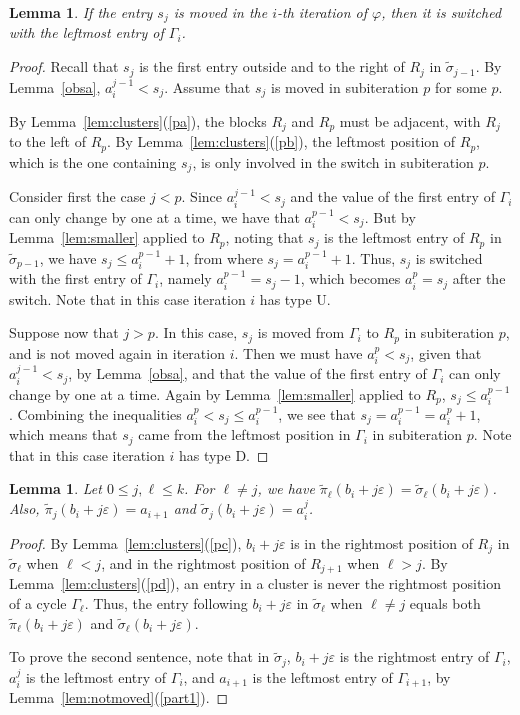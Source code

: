 \documentclass[11pt]{amsart}
\newtheorem{lemma}[theorem]{Lemma}
\newcommand\wt{\widetilde}
\newcommand\bij{\varphi}
\newcommand\eps{\varepsilon}
\newcommand\sigm{\wt\sigma}
\newcommand\pim{\wt\pi}
\begin{document}
\begin{lemma}\label{obsd}
If the entry $s_j$ is moved in the $i$-th iteration of $\bij$, then it is switched with the leftmost entry of $\Gamma_i$.
\end{lemma}

\begin{proof}
Recall that $s_j$ is the first entry outside and to the right of $R_j$ in $\sigm_{j-1}$. By Lemma~\ref{obsa}, $a_i^{j-1}<s_j$. Assume that $s_j$ is moved in subiteration $p$ for some $p$.

By Lemma~\ref{lem:clusters}(\ref{pa}), the blocks $R_j$ and $R_p$ must be adjacent, with $R_j$ to the left of $R_p$. By Lemma~\ref{lem:clusters}(\ref{pb}),
the leftmost position of $R_p$, which is the one containing $s_j$, is only involved in the switch in subiteration $p$.

Consider first the case $j<p$. Since $a_i^{j-1}<s_j$ and the value of the first entry of $\Gamma_i$ can only change by one at a time,
we have that $a_i^{p-1}<s_j$. But by Lemma~\ref{lem:smaller} applied to $R_p$, noting that $s_j$ is the leftmost entry of $R_p$ in $\sigm_{p-1}$, we have
$s_j\le a_i^{p-1}+1$, from where $s_j=a_i^{p-1}+1$. Thus, $s_j$ is switched with the first entry of $\Gamma_i$, namely $a_i^{p-1}=s_j-1$, which becomes $a_i^p=s_j$ after the switch. Note that in this case iteration $i$ has type U.

Suppose now that $j>p$. In this case, $s_j$ is moved from $\Gamma_i$ to $R_p$ in subiteration $p$, and is not moved again in iteration $i$. Then we must have $a_i^{p}<s_j$, given that $a_i^{j-1}<s_j$, by Lemma~\ref{obsa},
and that the value of the first entry of $\Gamma_i$ can only change by one at a time. Again by Lemma~\ref{lem:smaller} applied to $R_p$, $s_j\le a_i^{p-1}$. Combining the inequalities $a_i^{p}<s_j\le a_i^{p-1}$, we see that
$s_j=a_i^{p-1}=a_i^p+1$, which means that $s_j$ came from the leftmost position in $\Gamma_i$ in subiteration $p$. Note that in this case iteration $i$ has type D.
\end{proof}

\begin{lemma}\label{obsf}
Let $0\le j,\ell\le k$. For $\ell\neq j$, we have $\pim_\ell(b_i+j\eps)=\sigm_\ell(b_i+j\eps)$.
Also, $\pim_j(b_i+j\eps)=a_{i+1}$ and $\sigm_j(b_i+j\eps)=a_i^j$.
\end{lemma}

\begin{proof}
By Lemma~\ref{lem:clusters}(\ref{pc}), $b_i+j\eps$ is in the rightmost position of $R_j$ in $\sigm_\ell$ when $\ell<j$, and in the rightmost position of $R_{j+1}$ when $\ell>j$.
By Lemma~\ref{lem:clusters}(\ref{pd}), an entry in a cluster is never the rightmost position of a cycle $\Gamma_\ell$. Thus, the entry following $b_i+j\eps$ in $\sigm_\ell$ when $\ell\neq j$ equals
both $\pim_\ell(b_i+j\eps)$ and $\sigm_\ell(b_i+j\eps)$.

To prove the second sentence, note that in $\sigm_j$, $b_i+j\eps$ is the rightmost entry of $\Gamma_i$, $a_i^j$ is the leftmost entry of $\Gamma_i$, and $a_{i+1}$ is the leftmost entry of $\Gamma_{i+1}$, by
Lemma~\ref{lem:notmoved}(\ref{part1}).
\end{proof}
\end{document}
